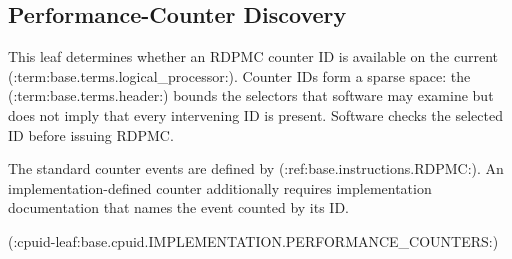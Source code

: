\par\Needspace{2.50in}
\subsection{Performance-Counter Discovery}\label{section:performance-counter-discovery}
This leaf determines whether an RDPMC counter ID is available on the current (:term:base.terms.logical_processor:).
Counter IDs form a sparse space: the (:term:base.terms.header:) bounds the selectors that software may examine but does
not imply that every intervening ID is present. Software checks the selected ID before issuing RDPMC.

The standard counter events are defined by (:ref:base.instructions.RDPMC:). An implementation-defined counter
additionally requires implementation documentation that names the event counted by its ID.

(:cpuid-leaf:base.cpuid.IMPLEMENTATION.PERFORMANCE_COUNTERS:)
